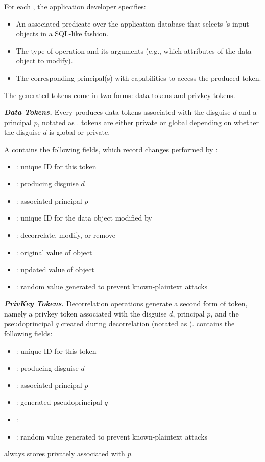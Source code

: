 For each , the application developer specifies:
\begin{itemize}
    \item An associated predicate over the application database that selects 's input
        objects in a SQL-like fashion.
    \item The type of operation and its arguments (e.g., which attributes of the data object to
        modify).
    \item The corresponding principal(s) with capabilities to access the produced token.
\end{itemize}

\noindent
The generated tokens come in two forms: data tokens and privkey tokens.

\vspace{6pt}
\noindent\textbf{\emph{Data Tokens.}}
Every  produces data tokens associated with the disguise $d$ and a
principal $p$, notated as .  tokens are either private or global depending on
whether the disguise $d$ is global or private. 

A  contains the following fields, which record changes performed by :
\begin{itemize}
\item {}: unique ID for this token
\item {}: producing disguise $d$ 
\item {}: associated principal $p$
\item {}: unique ID for the data object modified by 
\item {}: decorrelate, modify, or remove
\item {}: original value of object 
\item {}: updated value of object 
\item {}: random value generated to prevent known-plaintext attacks
\end{itemize}

\noindent\textbf{\emph{PrivKey Tokens.}}
Decorrelation operations generate a second form of token, namely a privkey token associated with the disguise $d$, principal $p$, and the pseudoprincipal $q$ created
during decorrelation (notated as ).
 contains the following fields:
\begin{itemize}
\item {}: unique ID for this token
\item {}: producing disguise $d$ 
\item {}: associated principal $p$
\item {}: generated pseudoprincipal $q$
\item {}: 
\item {}: random value generated to prevent known-plaintext attacks
\end{itemize}
\sys always stores  privately associated with $p$. 

